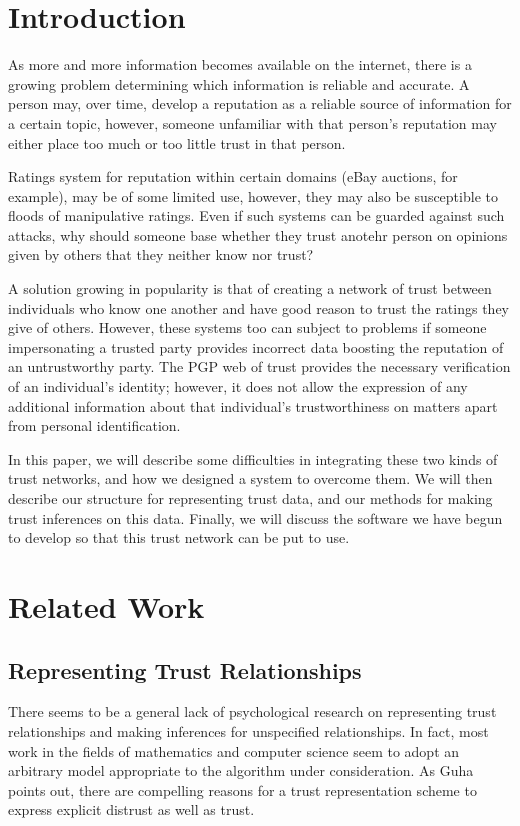 \documentclass[onecolumn]{acm_proc_article-sp}
\begin{document}


\section{Introduction}
As more and more information becomes available on the internet, there is a growing problem determining which information is reliable and accurate.  A person may, over time, develop a reputation as a reliable source of information for a certain topic, however, someone unfamiliar with that person's reputation may either place too much or too little trust in that person.  

Ratings system for reputation within certain domains (eBay auctions, for example), may be of some limited use, however, they may also be susceptible to floods of manipulative ratings.  Even if such systems can be guarded against such attacks, why should someone base whether they trust anotehr person on opinions given by others that they neither know nor trust?

A solution growing in popularity is that of creating a network of trust between individuals who know one another and have good reason to trust the ratings they give of others.  However, these systems too can subject to problems if someone impersonating a trusted party provides incorrect data boosting the reputation of an untrustworthy party.  The PGP web of trust provides the necessary verification of an individual's identity; however, it does not allow the expression of any additional information about that individual's trustworthiness on matters apart from personal identification.

In this paper, we will describe some difficulties in integrating these two kinds of trust networks, and how we designed a system to overcome them.  We will then describe our structure for representing trust data, and our methods for making trust inferences on this data.  Finally, we will discuss the software we have begun to develop so that this trust network can be put to use.

\section{Related Work}

\subsection{Representing Trust Relationships}
There seems to be a general lack of psychological research on representing trust relationships and making inferences for unspecified relationships. In fact, most work in the fields of mathematics and computer science seem to adopt an arbitrary model appropriate to the algorithm under consideration. As Guha points out\cite{guha04propagation}, there are compelling reasons for a trust representation scheme to express explicit distrust as well as trust.
\end{document}
